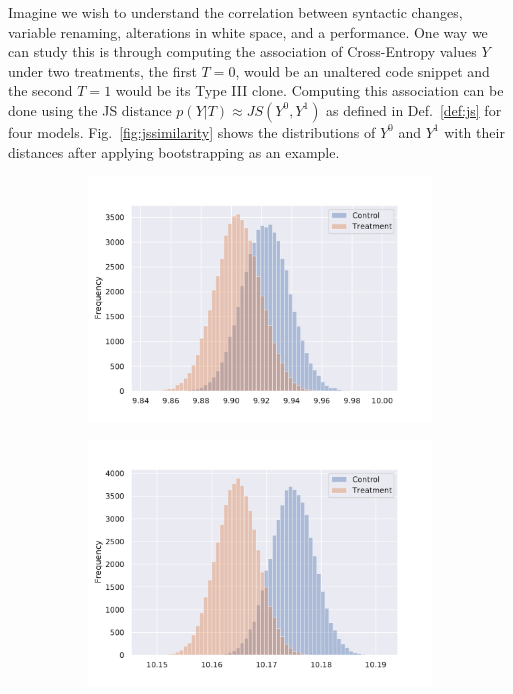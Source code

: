 \begin{exmp}
\label{exmp:js}Imagine we wish to understand the correlation between syntactic changes, \ie variable renaming, alterations in white space, \etc and a \nlms performance. One way we can study this is through computing the association of Cross-Entropy values $Y$ under two treatments, the first $T=0$, would be an unaltered code snippet and the second $T=1$ would be its Type III clone. Computing this association can be done using the JS distance $p(Y|T)\approx JS(Y^0,Y^1)$ as defined in Def.~\ref{def:js} for four models. Fig.~\ref{fig:jssimilarity} shows the distributions of $Y^0$ and $Y^1$ with their distances after applying bootstrapping as an example.

\begin{figure}[h]
  \centering
  \begin{subfigure}[b]{0.46\linewidth}
    \includegraphics[width=\linewidth]{graphics/preliminaries/association/cross-entropy-rnn1-distribution-clone3-300dpi.pdf}
  \end{subfigure}
  \begin{subfigure}[b]{0.46\linewidth}
    \includegraphics[width=\linewidth]{graphics/preliminaries/association/cross-entropy-gru1-distribution-clone3-300dpi.pdf}

\end{subfigure}
\end{figure}
\end{exmp}
